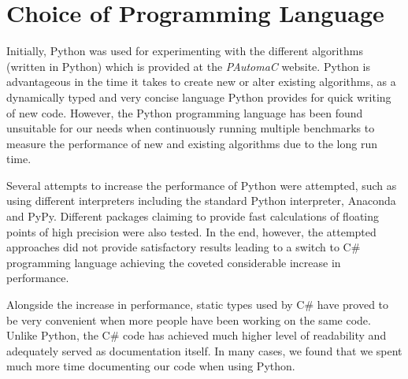\section{Choice of Programming Language}
Initially, Python was used for experimenting with the different algorithms (written in Python) which is provided at the \emph{PAutomaC} website. Python is advantageous in the time it takes to create new or alter existing algorithms, as a dynamically typed and very concise language Python provides for quick writing of new code. However, the Python programming language has been found unsuitable for our needs when continuously running multiple benchmarks to measure the performance of new and existing algorithms due to the long run time.

Several attempts to increase the performance of Python were attempted, such as using different interpreters including the standard Python interpreter, Anaconda and PyPy. Different packages claiming to provide fast calculations of floating points of high precision were also tested. In the end, however, the attempted approaches did not provide satisfactory results leading to a switch to C\# programming language achieving the coveted considerable increase in performance.

Alongside the increase in performance, static types used by  C\# have proved to be very convenient when more people have been working on the same code. Unlike Python, the C\# code has achieved much higher level of readability and adequately served as documentation itself. In many cases, we found that we spent much more time documenting our code when using Python.